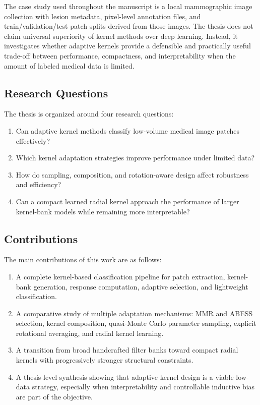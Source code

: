 \documentclass{cernatsnote}
\let\oldsubsection\subsection
\let\oldsubsubsection\subsubsection
\let\section\oldsubsection
\let\subsection\oldsubsubsection
\begin{document}
The case study used throughout the manuscript is a local mammographic image collection with lesion metadata, pixel-level annotation files, and train/validation/test patch splits derived from those images. The thesis does not claim universal superiority of kernel methods over deep learning. Instead, it investigates whether adaptive kernels provide a defensible and practically useful trade-off between performance, compactness, and interpretability when the amount of labeled medical data is limited.

\section{Research Questions}
The thesis is organized around four research questions:
\begin{enumerate}[label=\arabic*.]
    \item Can adaptive kernel methods classify low-volume medical image patches effectively?
    \item Which kernel adaptation strategies improve performance under limited data?
    \item How do sampling, composition, and rotation-aware design affect robustness and efficiency?
    \item Can a compact learned radial kernel approach the performance of larger kernel-bank models while remaining more interpretable?
\end{enumerate}

\section{Contributions}
The main contributions of this work are as follows:
\begin{enumerate}[label=\arabic*.]
    \item A complete kernel-based classification pipeline for patch extraction, kernel-bank generation, response computation, adaptive selection, and lightweight classification.
    \item A comparative study of multiple adaptation mechanisms: MMR and ABESS selection, kernel composition, quasi-Monte Carlo parameter sampling, explicit rotational averaging, and radial kernel learning.
    \item A transition from broad handcrafted filter banks toward compact radial kernels with progressively stronger structural constraints.
    \item A thesis-level synthesis showing that adaptive kernel design is a viable low-data strategy, especially when interpretability and controllable inductive bias are part of the objective.
\end{enumerate}
\end{document}
